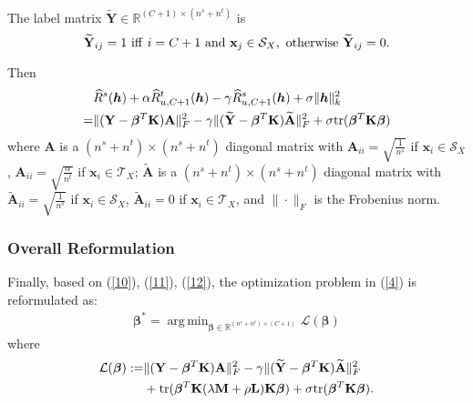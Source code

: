 \documentclass[journal]{IEEEtran}
\DeclareMathOperator*{\argmin}{arg\,min}
\begin{document}
 The  label matrix $\mathbf{\widetilde{Y}}\in \mathbb{R}^{(C+1)\times(n^s+n^t)}$ is
 \begin{equation}\label{Y2}
\mathbf{\widetilde{Y}}_{ij}= 1
~{\rm iff} ~i= C+1 {~\rm and}~\mathbf{x}_j \in\mathcal{S}_{X} , ~{\rm otherwise}~\mathbf{\widetilde{Y}}_{ij}=0.
\end{equation}

Then
\begin{equation}\label{12}
\begin{split}
    &{\widehat{R}^s({\bm h})} +\alpha\widehat{R}^t_{u,C+1}({\bm h})-\gamma\widehat{R}^s_{u,C+1}({\bm h})+\sigma \|{\bm h}\|_k^2\\=&{\|(\mathbf{Y}-{\bm {\bm \beta}}^T\mathbf{K})\mathbf{A}\|_F^2}-\gamma{\|(\mathbf{\widetilde{Y}}-{\bm {\bm \beta}}^T\mathbf{K})\mathbf{\widetilde{A}}\|_F^2}+\sigma {\rm tr}({\bm {\bm \beta}}^T\mathbf{ K}{\bm {\bm \beta}})
    \end{split}
\end{equation}
where $\mathbf{A}$ is a $(n^s+n^t)\times(n^s+n^t)$ diagonal matrix with $\mathbf{A}_{ii}=\sqrt{\frac{1}{n^s}}$ if $\mathbf{x}_i \in \mathcal{S}_X$,  $\mathbf{A}_{ii}=\sqrt{\frac{\alpha}{n^t}}$ if $\mathbf{x}_i\in \mathcal{T}_X$; $\mathbf{\widetilde{A}}$ is a $(n^s+n^t)\times(n^s+n^t)$ diagonal matrix with $\widetilde{\mathbf{A}}_{ii}=\sqrt{\frac{1 }{n^s}}$ if $\mathbf{x}_i \in \mathcal{S}_X$,  $\widetilde{\mathbf{A}}_{ii}=0$ if $\mathbf{x}_i\in \mathcal{T}_X$, and $\|\cdot\|_F$ is the Frobenius norm.


\subsubsection{Overall Reformulation}

Finally, based on (\ref{10}), (\ref{11}), (\ref{12}), the optimization problem in (\ref{4}) is reformulated as:
\begin{equation*}
 \begin{split}
{\bm \beta}^* = \argmin_{{\bm \beta} \in \mathbb{R}^{ (n^s+n^t)\times (C+1)}} \mathcal{L}({\bm \beta})
\end{split}
\end{equation*}
where 
\begin{equation}\label{HHH}
 \begin{split}
\mathcal{L}({\bm \beta}) :=  &{\|(\mathbf{Y}-{\bm {\bm \beta}}^T\mathbf{K})\mathbf{A}\|_F^2}-\gamma{\|(\mathbf{\widetilde{Y}}-{\bm {\bm \beta}}^T\mathbf{K})\mathbf{\widetilde{A}}\|_F^2} \\
&+ {\rm tr}(\mathbf{{\bm \beta}}^T\mathbf{K(\lambda M+\rho L) K}\mathbf{{\bm \beta}})
+\sigma {\rm tr}( \bm{\beta}^T\mathbf{ K}{\bm{\beta}}).
\end{split}
\end{equation}
\end{document}
